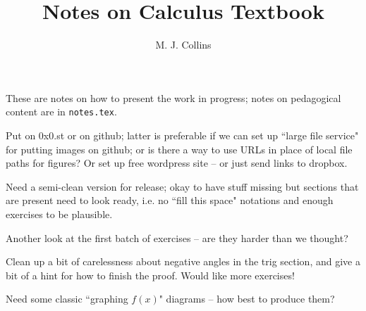 \documentclass[11pt, oneside]{article}   	%
\title{Notes on Calculus Textbook}
\author{M. J. Collins}
\begin{document}
\maketitle
These are notes on how to present the work in progress; notes on pedagogical content are in \texttt{notes.tex}.

Put on 0x0.st or on github; latter is preferable if we can set up ``large file service" for putting images on github; or is there a way to use URLs in place of local file paths for figures? Or set up free wordpress site -- or just send links to dropbox.

Need a semi-clean version for release; okay to have stuff missing but sections that are present need to look ready, i.e. no ``fill this space" notations and enough exercises to be plausible.

Another look at the first batch of exercises -- are they harder than we thought?

Clean up a bit of carelessness about negative angles in the trig section, and give a bit of a hint for how to finish the proof. Would like more exercises!

Need some classic ``graphing $f(x)$" diagrams -- how best to produce them?
\end{document}
